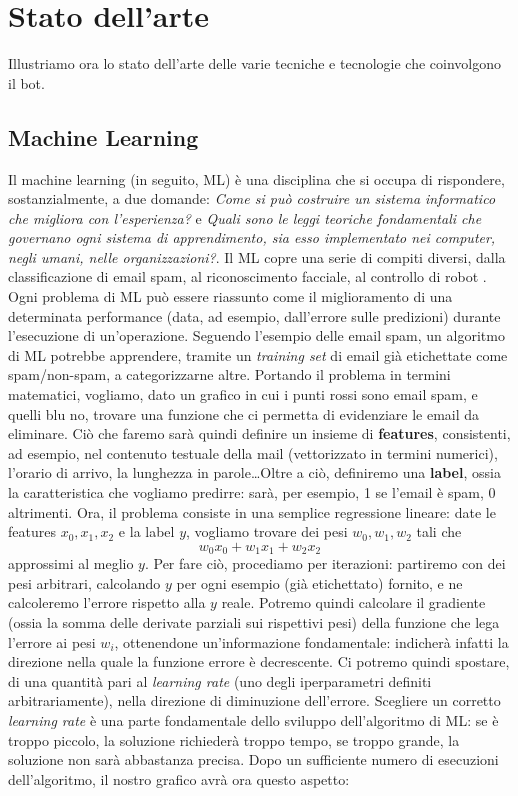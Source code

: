 \chapter{Stato dell'arte}
\label{chap:stateofart}
Illustriamo ora lo stato dell'arte delle varie tecniche e tecnologie che coinvolgono il bot.
\section{Machine Learning}
Il machine learning (in seguito, ML) è una disciplina che si occupa di rispondere, sostanzialmente, a due domande: \textit{Come si può costruire un sistema informatico che migliora con l'esperienza?} e \textit{Quali sono le leggi teoriche fondamentali che governano ogni sistema di apprendimento, sia esso implementato nei computer, negli umani, nelle organizzazioni?}. Il ML copre una serie di compiti diversi, dalla classificazione di email spam, al riconoscimento facciale, al controllo di robot \cite{book:mitchell1997machine}. Ogni problema di ML può essere riassunto come il miglioramento di una determinata performance (data, ad esempio, dall'errore sulle predizioni) durante l'esecuzione di un'operazione. Seguendo l'esempio delle email spam, un algoritmo di ML potrebbe apprendere, tramite un \textit{training set} di email già etichettate come spam/non-spam, a categorizzarne altre.
Portando il problema in termini matematici, vogliamo, dato un grafico
in cui i punti rossi sono email spam, e quelli blu no, trovare una funzione che ci permetta di evidenziare le email da eliminare. Ciò che faremo sarà quindi definire un insieme di \textbf{features}, consistenti, ad esempio, nel contenuto testuale della mail (vettorizzato in termini numerici), l'orario di arrivo, la lunghezza in parole\dots Oltre a ciò, definiremo una \textbf{label}, ossia la caratteristica che vogliamo predirre: sarà, per esempio, 1 se l'email è spam, 0 altrimenti. Ora, il problema consiste in una semplice regressione lineare: date le features $x_0, x_1, x_2$ e la label $y$, vogliamo trovare dei pesi $w_0, w_1, w_2$ tali che
\begin{displaymath}
    w_0x_0+w_1x_1+w_2x_2
\end{displaymath}
approssimi al meglio $y$. Per fare ciò, procediamo per iterazioni: partiremo con dei pesi arbitrari, calcolando $y$ per ogni esempio (già etichettato) fornito, e ne calcoleremo l'errore rispetto alla $y$ reale. Potremo quindi calcolare il gradiente (ossia la somma delle derivate parziali sui rispettivi pesi) della funzione che lega l'errore ai pesi $w_i$, ottenendone un'informazione fondamentale: indicherà infatti la direzione nella quale la funzione errore è decrescente. Ci potremo quindi spostare, di una quantità pari al \textit{learning rate} (uno degli iperparametri definiti arbitrariamente), nella direzione di diminuzione dell'errore. Scegliere un corretto \textit{learning rate} è una parte fondamentale dello sviluppo dell'algoritmo di ML: se è troppo piccolo, la soluzione richiederà troppo tempo, se troppo grande, la soluzione non sarà abbastanza precisa. Dopo un sufficiente numero di esecuzioni dell'algoritmo, il nostro grafico avrà ora questo aspetto:
